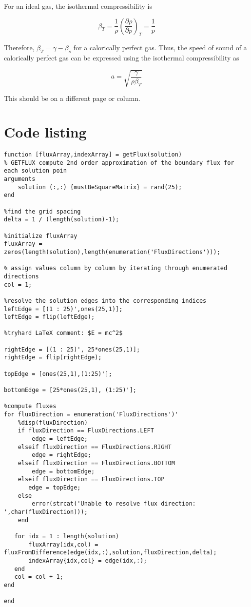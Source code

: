 \documentclass[twocolumn]{article}
\begin{document}
For an ideal gas, the isothermal compressibility is 

\begin{equation}
    \beta_T = \frac{1}{\rho} \left(\frac{\partial \rho}{\partial p} \right)_T = \frac{1}{p}
\end{equation}

Therefore, $\beta_T = \gamma- \beta_s$ for a calorically perfect gas. Thus, the speed of sound of a calorically perfect gas can be expressed using the isothermal compressibility as 

\begin{equation}
    \boxed{a = \sqrt{\frac{\gamma}{\rho \beta_T}}}
    \end{equation}

\pagebreak

\pagebreak
{}
This should be on a different page or column.

\pagebreak
\appendix
\section{Code listing}

\begin{verbatim}
function [fluxArray,indexArray] = getFlux(solution)
% GETFLUX compute 2nd order approximation of the boundary flux for each solution poin
arguments
    solution (:,:) {mustBeSquareMatrix} = rand(25);
end

%find the grid spacing
delta = 1 / (length(solution)-1); 

%initialize fluxArray
fluxArray = zeros(length(solution),length(enumeration('FluxDirections')));

% assign values column by column by iterating through enumerated directions
col = 1;

%resolve the solution edges into the corresponding indices
leftEdge = [(1 : 25)',ones(25,1)];
leftEdge = flip(leftEdge);

%tryhard LaTeX comment: $E = mc^2$

rightEdge = [(1 : 25)', 25*ones(25,1)];
rightEdge = flip(rightEdge);

topEdge = [ones(25,1),(1:25)'];

bottomEdge = [25*ones(25,1), (1:25)'];

%compute fluxes
for fluxDirection = enumeration('FluxDirections')'
    %disp(fluxDirection)
    if fluxDirection == FluxDirections.LEFT
        edge = leftEdge;
    elseif fluxDirection == FluxDirections.RIGHT
        edge = rightEdge;
    elseif fluxDirection == FluxDirections.BOTTOM
        edge = bottomEdge;
    elseif fluxDirection == FluxDirections.TOP
       edge = topEdge;
    else
        error(strcat('Unable to resolve flux direction: ',char(fluxDirection)));
    end
    
   for idx = 1 : length(solution)
       fluxArray(idx,col) = fluxFromDifference(edge(idx,:),solution,fluxDirection,delta);
       indexArray{idx,col} = edge(idx,:);
   end
   col = col + 1;
end

end

\end{verbatim}
\end{document}
